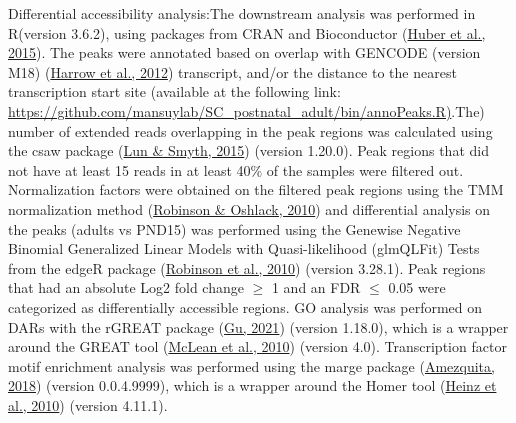 \documentclass[12pt,twoside]{reedthesis}
\begin{document}
Differential accessibility analysis:The downstream analysis was
performed in R(version 3.6.2), using packages from CRAN and Bioconductor
(\protect\hyperlink{ref-huber2015}{Huber et al., 2015}). The peaks were annotated based on overlap with GENCODE
(version M18) (\protect\hyperlink{ref-harrow2012}{Harrow et al., 2012}) transcript, and/or the distance to the
nearest transcription start site (available at the following link:
\href{https://github.com/mansuylab/SC_postnatal_adult/bin/annoPeaks.R}{https://github.com/mansuylab/SC\_postnatal\_adult/bin/annoPeaks.R)}.The)
number of extended reads overlapping in the peak regions was calculated
using the csaw package (\protect\hyperlink{ref-lun2015}{Lun \& Smyth, 2015}) (version 1.20.0). Peak regions that
did not have at least 15 reads in at least 40\% of the samples were
filtered out. Normalization factors were obtained on the filtered peak
regions using the TMM normalization method (\protect\hyperlink{ref-robinson2010a}{Robinson \& Oshlack, 2010}) and
differential analysis on the peaks (adults vs PND15) was performed using
the Genewise Negative Binomial Generalized Linear Models with
Quasi-likelihood (glmQLFit) Tests from the edgeR package (\protect\hyperlink{ref-robinson2010}{Robinson et al., 2010})
(version 3.28.1). Peak regions that had an absolute Log2 fold change
\(\geq\) 1 and an FDR \(\leq\) 0.05 were categorized as differentially
accessible regions. GO analysis was performed on DARs with the rGREAT
package (\protect\hyperlink{ref-gu2021}{Gu, 2021}) (version 1.18.0), which is a wrapper around the GREAT
tool (\protect\hyperlink{ref-mclean2010}{McLean et al., 2010}) (version 4.0). Transcription factor motif enrichment
analysis was performed using the marge package (\protect\hyperlink{ref-amezquita2018}{Amezquita, 2018}) (version
0.0.4.9999), which is a wrapper around the Homer tool (\protect\hyperlink{ref-heinz2010}{Heinz et al., 2010})
(version 4.11.1).
\end{document}
